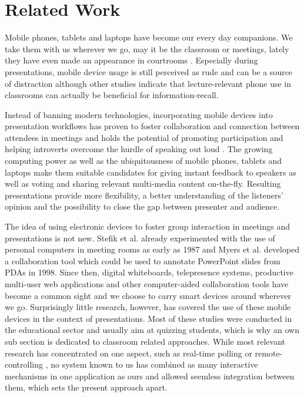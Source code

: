 \chapter{Related Work}
\label{cha:related-work}

Mobile phones, tablets and laptops have become our every day companions. We take them with us wherever we go, may it be the classroom or meetings, lately they have even made an appearance in courtrooms \cite{Farrell:TrialByTablet}. Especially during presentations, mobile device usage is still perceived as rude and can be a source of distraction \cite{Bohmer:SmartphoneUseRude, Bajko:ComparativePerceptionSmartphoneMeeting, Kuznekoff:ImpactPhoneStudentLearning} although other studies indicate that lecture-relevant phone use in classrooms can actually be beneficial \cite{Kuznekoff:MobilePhoneClassroomTwitter} for information-recall.

Instead of banning modern technologies, incorporating mobile devices into presentation workflows has proven to foster collaboration and connection between attendees in meetings \cite{Bohmer:SmartphoneUseRude} and holds the potential of promoting participation and helping introverts overcome the hurdle of speaking out loud \cite{Bry:Backstage}. The growing computing power as well as the ubiquitousness of mobile phones, tablets and laptops make them suitable candidates for giving instant feedback to speakers as well as voting and sharing relevant multi-media content on-the-fly. Resulting presentations provide more flexibility, a better understanding of the listeners' opinion and the possibility to close the gap between presenter and audience.

The idea of using electronic devices to foster group interaction in meetings and presentations is not new. Stefik et al. \cite{Stefik:BeyondTheChalkboard} already experimented with the use of personal computers in meeting rooms as early as 1987 and Myers et al. \cite{Myers:CollaborationPDAs} developed a collaboration tool which could be used to annotate PowerPoint slides from PDAs in 1998. Since then, digital whiteboards, telepresence systems, productive multi-user web applications and other computer-aided collaboration tools have become a common sight and we choose to carry smart devices around wherever we go. Surprisingly little research, however, has covered the use of these mobile devices in the context of presentations. Most of these studies were conducted in the educational sector and usually aim at quizzing students, which is why an own sub section is dedicated to classroom related approaches. While most relevant research has concentrated on one aspect, such as real-time polling \cite{Inoue:RealTimeQuestionnaire} or remote-controlling \cite{Chattopadhyay:OfficeSocialRemoteControl}, no system known to us has combined as many interactive mechanisms in one application as ours and allowed seemless integration between them, which sets the present approach apart.

